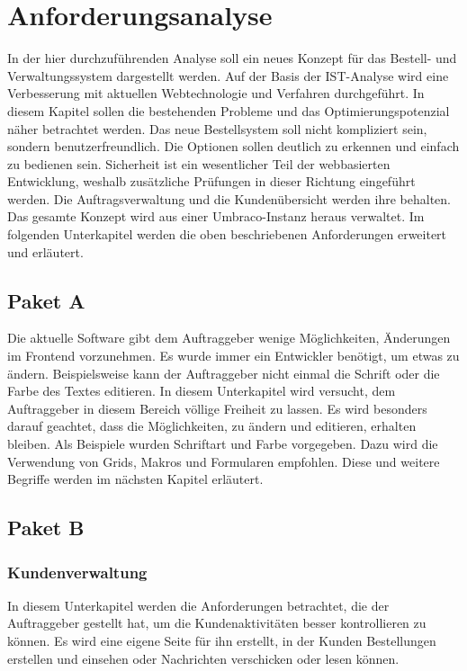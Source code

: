 \chapter{Anforderungsanalyse}

In der hier durchzuführenden Analyse soll ein neues Konzept für das Bestell- und Verwaltungssystem dargestellt werden. Auf der Basis der IST-Analyse wird eine Verbesserung mit aktuellen Webtechnologie und Verfahren durchgeführt. In diesem Kapitel sollen die bestehenden Probleme und das Optimierungspotenzial näher betrachtet werden.
Das neue Bestellsystem soll nicht kompliziert sein, sondern benutzerfreundlich. Die Optionen sollen deutlich zu erkennen und einfach zu bedienen sein. Sicherheit ist ein wesentlicher Teil der webbasierten Entwicklung, weshalb zusätzliche Prüfungen in dieser Richtung eingeführt werden. Die Auftragsverwaltung und die Kundenübersicht werden ihre behalten. Das gesamte Konzept wird aus einer Umbraco-Instanz heraus verwaltet. Im folgenden Unterkapitel werden die oben beschriebenen Anforderungen erweitert und erläutert.



\section{Paket A}

Die aktuelle Software gibt dem Auftraggeber wenige Möglichkeiten, Änderungen im Frontend vorzunehmen. Es wurde immer ein Entwickler benötigt, um etwas zu ändern. Beispielsweise kann der Auftraggeber nicht einmal die Schrift oder die Farbe des Textes editieren.
In diesem Unterkapitel wird versucht, dem Auftraggeber in diesem Bereich völlige Freiheit zu lassen. Es wird besonders darauf geachtet, dass die Möglichkeiten, zu ändern und editieren, erhalten bleiben. Als Beispiele wurden Schriftart und Farbe vorgegeben.
Dazu wird die Verwendung von Grids, Makros und Formularen empfohlen. Diese und weitere Begriffe werden im nächsten Kapitel erläutert.

\section{Paket B}


\subsection{Kundenverwaltung}

In diesem Unterkapitel werden die Anforderungen betrachtet, die der Auftraggeber gestellt hat, um die Kundenaktivitäten besser kontrollieren zu können. Es wird eine eigene Seite für ihn erstellt, in der Kunden Bestellungen erstellen und einsehen oder Nachrichten verschicken oder lesen können.

